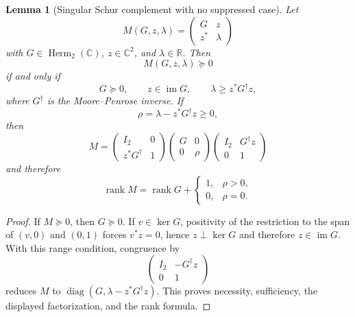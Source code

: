 \documentclass[11pt]{article}
\newtheorem{lemma}[theorem]{Lemma}
\theoremstyle{definition}
\newcommand{\C}{\mathbb C}
\newcommand{\R}{\mathbb R}
\newcommand{\Herm}{\operatorname{Herm}}
\newcommand{\rank}{\operatorname{rank}}
\newcommand{\im}{\operatorname{im}}
\newcommand{\diag}{\operatorname{diag}}
\begin{document}
\begin{lemma}[Singular Schur complement with no suppressed case]\label{lem:schur}
Let
\[
 M(G,z,\lambda)=\begin{pmatrix}G&z\\z^*&\lambda\end{pmatrix}
\]
with $G\in\Herm_2(\C)$, $z\in\C^2$, and $\lambda\in\R$.  Then
\[
 M(G,z,\lambda)\succeq0
\]
if and only if
\[
 \boxed{
 G\succeq0,\qquad z\in\im G,\qquad
 \lambda\geq z^*G^\dagger z,}
\]
where $G^\dagger$ is the Moore--Penrose inverse.  If
\[
 \rho=\lambda-z^*G^\dagger z\geq0,
\]
then
\[
 M=\begin{pmatrix}I_2&0\\z^*G^\dagger&1\end{pmatrix}
   \begin{pmatrix}G&0\\0&\rho\end{pmatrix}
   \begin{pmatrix}I_2&G^\dagger z\\0&1\end{pmatrix}
\]
and therefore
\[
 \rank M=\rank G+\begin{cases}1,&\rho>0,\\0,&\rho=0.\end{cases}
\]
\end{lemma}

\begin{proof}
If $M\succeq0$, then $G\succeq0$.  If $v\in\ker G$, positivity of the restriction to the span of $(v,0)$ and $(0,1)$ forces $v^*z=0$, hence $z\perp\ker G$ and therefore $z\in\im G$.  With this range condition, congruence by
\[
 \begin{pmatrix}I_2&-G^\dagger z\\0&1\end{pmatrix}
\]
reduces $M$ to $\diag(G,\lambda-z^*G^\dagger z)$.  This proves necessity, sufficiency, the displayed factorization, and the rank formula.
\end{proof}
\end{document}
